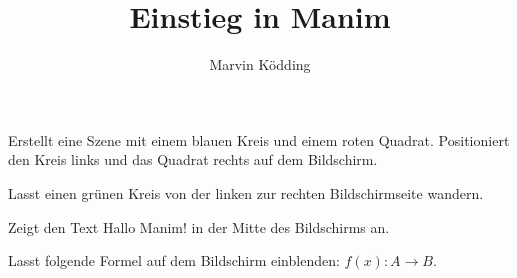 \documentclass[a4paper, 12pt]{mksheetphhd}
\title{Einstieg in Manim}
\author{Marvin Ködding}
\begin{document}
	\printtitle
	
	\vspace*{.5cm}
	
	\begin{aufgabe}
		Erstellt eine Szene mit einem blauen Kreis und einem roten Quadrat. Positioniert den Kreis links und das Quadrat rechts auf dem Bildschirm.
	\end{aufgabe}
	
	\begin{aufgabe}
		Lasst einen grünen Kreis von der linken zur rechten Bildschirmseite wandern.
	\end{aufgabe}
	
	\begin{aufgabe}
		Zeigt den Text \glqq{}Hallo Manim!\grqq{} in der Mitte des Bildschirms an.
	\end{aufgabe}
	
	\begin{aufgabe}
		Lasst folgende Formel auf dem Bildschirm einblenden: $f(x): A \to B$.
	\end{aufgabe}
	
	\printlicense
	
	\printsocials
	
\end{document}
